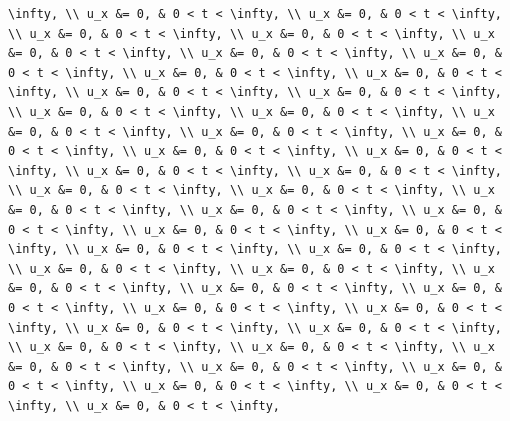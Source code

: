 \documentclass[
  ukrainian,
]{article}
\begin{document}
\begin{verbatim}
\infty, \\ u_x &= 0, & 0 < t < \infty, \\ u_x &= 0, & 0 < t < \infty, \\ u_x &= 0, & 0 < t < \infty, \\ u_x &= 0, & 0 < t < \infty, \\ u_x &= 0, & 0 < t < \infty, \\ u_x &= 0, & 0 < t < \infty, \\ u_x &= 0, & 0 < t < \infty, \\ u_x &= 0, & 0 < t < \infty, \\ u_x &= 0, & 0 < t < \infty, \\ u_x &= 0, & 0 < t < \infty, \\ u_x &= 0, & 0 < t < \infty, \\ u_x &= 0, & 0 < t < \infty, \\ u_x &= 0, & 0 < t < \infty, \\ u_x &= 0, & 0 < t < \infty, \\ u_x &= 0, & 0 < t < \infty, \\ u_x &= 0, & 0 < t < \infty, \\ u_x &= 0, & 0 < t < \infty, \\ u_x &= 0, & 0 < t < \infty, \\ u_x &= 0, & 0 < t < \infty, \\ u_x &= 0, & 0 < t < \infty, \\ u_x &= 0, & 0 < t < \infty, \\ u_x &= 0, & 0 < t < \infty, \\ u_x &= 0, & 0 < t < \infty, \\ u_x &= 0, & 0 < t < \infty, \\ u_x &= 0, & 0 < t < \infty, \\ u_x &= 0, & 0 < t < \infty, \\ u_x &= 0, & 0 < t < \infty, \\ u_x &= 0, & 0 < t < \infty, \\ u_x &= 0, & 0 < t < \infty, \\ u_x &= 0, & 0 < t < \infty, \\ u_x &= 0, & 0 < t < \infty, \\ u_x &= 0, & 0 < t < \infty, \\ u_x &= 0, & 0 < t < \infty, \\ u_x &= 0, & 0 < t < \infty, \\ u_x &= 0, & 0 < t < \infty, \\ u_x &= 0, & 0 < t < \infty, \\ u_x &= 0, & 0 < t < \infty, \\ u_x &= 0, & 0 < t < \infty, \\ u_x &= 0, & 0 < t < \infty, \\ u_x &= 0, & 0 < t < \infty, \\ u_x &= 0, & 0 < t < \infty, \\ u_x &= 0, & 0 < t < \infty, \\ u_x &= 0, & 0 < t < \infty, \\ u_x &= 0, & 0 < t < \infty, \\ u_x &= 0, & 0 < t < \infty, \\ u_x &= 0, & 0 < t < \infty, 
\end{verbatim}
\end{document}
